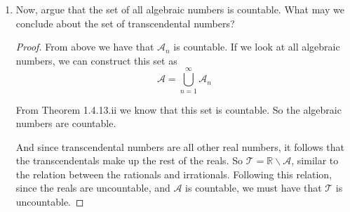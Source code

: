 \documentclass[12pt,letterpaper]{article}
\begin{document}
\begin{enumerate}
\begin{enumerate}
\begin{proof}
            We've already shown that the set of all finite subsets of $\mathbb{N}$ is countable.
            And, since $\mathcal{P}$ is actually the set of all finite subsets of $\mathbb{N}$,
            $\mathcal{P}$ is countable.

            Since each polynomial in $\mathcal{P}$ has a finite number of roots,
            only a finite number of algebraic numbers correspond to each polynomial.
            We can construct countable subsets of $\mathcal{A}_n$ comprised of these roots.

            Now, since each polynomial has a corresponding countable subset in $\mathcal{A}_n$,
            we can take the union of all these subsets in $\mathcal{A}_n$.
            According to Theorem 1.4.13.i,
            we have the union of all these subsets in $\mathcal{A}_n$ is countable.

            And of course, the union of all these subsets in $\mathcal{A}_n$ is
            just $\mathcal{A}_n$. So $\mathcal{A}_n$ is countable.
          \end{proof}

        \item Now, argue that the set of all algebraic numbers is countable.
          What may we conclude about the set of transcendental numbers?

          \begin{proof}
            From above we have that $\mathcal{A}_n$ is countable.
            If we look at all algebraic numbers, we can construct this set as
            \[\mathcal{A} = \bigcup_{n=1}^{\infty}{\mathcal{A}_n}\]

            From Theorem 1.4.13.ii we know that this set is countable.
            So the algebraic numbers are countable.

            And since transcendental numbers are all other real numbers,
            it follows that the transcendentals make up the rest of the reals.
            So $\mathcal{T} = \mathbb{R} \backslash \mathcal{A}$,
            similar to the relation between the rationals and irrationals.
            Following this relation,
            since the reals are uncountable, and $\mathcal{A}$ is countable,
            we must have that $\mathcal{T}$ is uncountable.
          \end{proof}
      \end{enumerate}
  \end{enumerate}
\end{document}
